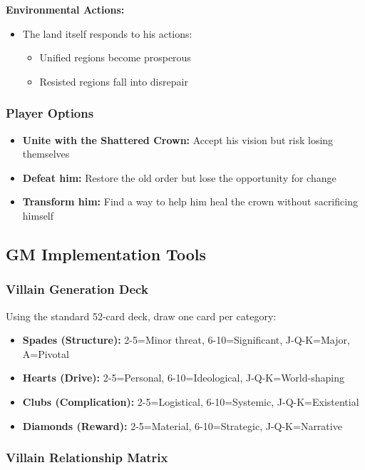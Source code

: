 \textbf{Environmental Actions:}
\begin{itemize}
  \item The land itself responds to his actions:
    \begin{itemize}
      \item Unified regions become prosperous
      \item Resisted regions fall into disrepair
    \end{itemize}
\end{itemize}

\subsubsection{Player Options}

\begin{itemize}
  \item \textbf{Unite with the Shattered Crown:} Accept his vision but risk losing themselves
  \item \textbf{Defeat him:} Restore the old order but lose the opportunity for change
  \item \textbf{Transform him:} Find a way to help him heal the crown without sacrificing himself
\end{itemize}

\subsection{GM Implementation Tools}

\subsubsection{Villain Generation Deck}

Using the standard 52-card deck, draw one card per category:

\begin{itemize}
  \item \textbf{Spades (Structure):} 2-5=Minor threat, 6-10=Significant, J-Q-K=Major, A=Pivotal
  \item \textbf{Hearts (Drive):} 2-5=Personal, 6-10=Ideological, J-Q-K=World-shaping
  \item \textbf{Clubs (Complication):} 2-5=Logistical, 6-10=Systemic, J-Q-K=Existential
  \item \textbf{Diamonds (Reward):} 2-5=Material, 6-10=Strategic, J-Q-K=Narrative
\end{itemize}

\subsubsection{Villain Relationship Matrix}

